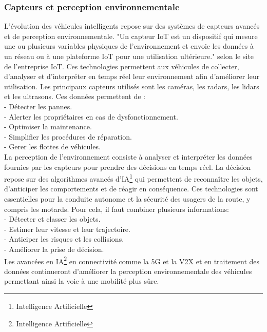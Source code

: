 \subsubsection{Capteurs et perception environnementale}
L'évolution des véhicules intelligents repose sur des systèmes de capteurs avancés et de perception environnementale.
"Un capteur IoT est un dispositif qui mesure une ou plusieurs variables physiques de l'environnement et envoie les données à un réseau ou à une plateforme IoT pour une utilisation ultérieure." selon le site de l'entreprise IoT\cite{iot_capteur}.
Ces technologies permettent aux véhicules de collecter, d'analyser et d'interpréter en temps réel leur environnement afin d'améliorer leur utilisation.
Les principaux capteurs utilisés sont les caméras, les radars, les lidars et les ultrasons.
Ces données permettent de :\\
- Détecter les pannes. \\
- Alerter les propriétaires en cas de dysfonctionnement. \\
- Optimiser la maintenance. \\
- Simplifier les procédures de réparation. \\
- Gerer les flottes de véhicules. \\


La perception de l'environnement consiste à analyser et interpréter les données fournies par les capteurs pour prendre des décisions en temps réel. La décision repose sur des algorithmes avancés d'IA\footnote{Intelligence Artificielle} qui permettent de reconnaître les objets, d'anticiper les comportements et de réagir en conséquence. Ces technologies sont essentielles pour la conduite autonome et la sécurité des usagers de la route, y compris les motards.
Pour cela, il faut combiner plusieurs informations:\\
- Détecter et classer les objets. \\
- Estimer leur vitesse et leur trajectoire. \\
- Anticiper les risques et les collisions. \\
- Améliorer la prise de décision.\\
Les avancées en IA\footnote{Intelligence Artificielle} en connectivité comme la 5G et la V2X et en traitement des données continueront d’améliorer la perception environnementale des véhicules permettant ainsi la voie à une mobilité plus sûre.

